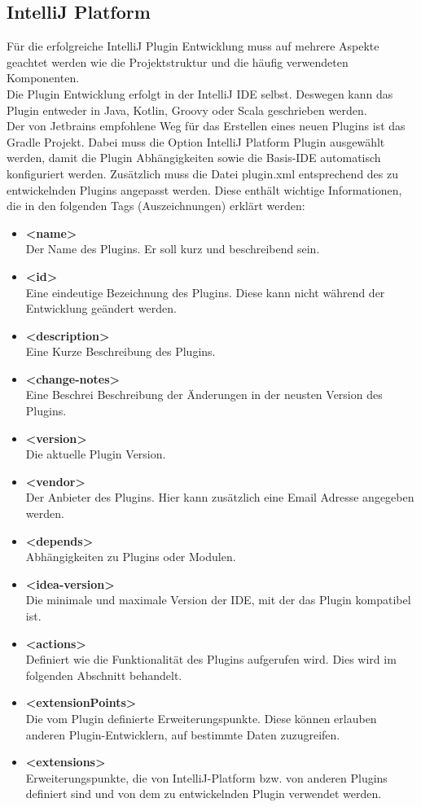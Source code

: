 	
	
	\subsection{IntelliJ Platform}
	Für die erfolgreiche IntelliJ Plugin Entwicklung muss auf mehrere Aspekte geachtet werden wie die Projektstruktur und die häufig verwendeten Komponenten.\\
	Die Plugin Entwicklung erfolgt in der IntelliJ IDE selbst. Deswegen kann das Plugin entweder in Java, Kotlin, Groovy oder Scala geschrieben werden.\\
	Der von Jetbrains empfohlene Weg für das Erstellen eines neuen Plugins ist das Gradle Projekt. Dabei muss die Option IntelliJ Platform Plugin ausgewählt werden, damit die Plugin Abhängigkeiten sowie die Basis-IDE automatisch konfiguriert werden. Zusätzlich muss die Datei plugin.xml entsprechend des zu entwickelnden Plugins angepasst werden. Diese enthält wichtige Informationen, die in den folgenden Tags (Auszeichnungen) erklärt werden:
	\begin{itemize}
		\item \textbf{<name>} \\
		Der Name des Plugins. Er soll kurz und beschreibend sein.
		\item \textbf{<id>} \\
		Eine eindeutige Bezeichnung des Plugins. Diese kann nicht während der Entwicklung geändert werden.
		\item \textbf{<description>} \\
		Eine Kurze Beschreibung des Plugins.
		\item \textbf{<change-notes>} \\
		Eine Beschrei Beschreibung der Änderungen in der neusten Version des Plugins.
		\item \textbf{<version>} \\
		Die aktuelle Plugin Version.
		\item \textbf{<vendor>} \\
		Der Anbieter des Plugins. Hier kann zusätzlich eine Email Adresse angegeben werden.
		\item \textbf{<depends>} \\
		Abhängigkeiten zu Plugins oder Modulen.
		\item \textbf{<idea-version>} \\
		Die minimale und maximale Version der IDE, mit der das Plugin kompatibel ist.
		\item \textbf{<actions>} \\
		Definiert wie die Funktionalität des Plugins aufgerufen wird. Dies wird im folgenden Abschnitt behandelt.
		\item \textbf{<extensionPoints>} \\
		Die vom Plugin definierte Erweiterungspunkte. Diese können erlauben anderen Plugin-Entwicklern, auf bestimmte Daten zuzugreifen. 
		\item \textbf{<extensions>} \\
		Erweiterungspunkte, die von IntelliJ-Platform bzw. von anderen Plugins definiert sind und von dem zu entwickelnden Plugin verwendet werden.
	\end{itemize}

